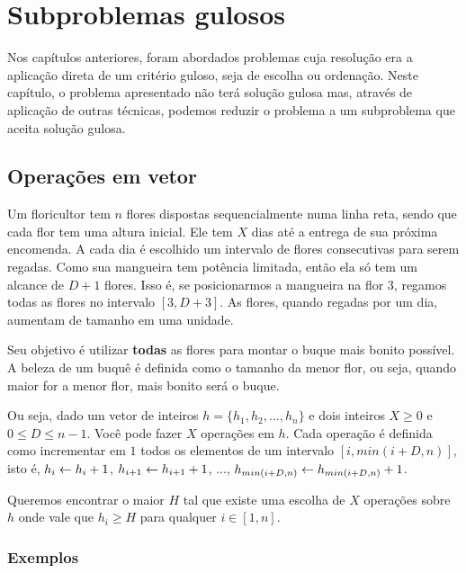\chapter{Subproblemas gulosos}
\label{subproblema}

Nos capítulos anteriores, foram abordados problemas cuja resolução era a aplicação direta de um critério guloso, seja de escolha ou ordenação. Neste capítulo, o problema apresentado não terá solução gulosa mas, através de aplicação de outras técnicas, podemos reduzir o problema a um subproblema que aceita solução gulosa.

\section{Operações em vetor}

Um floricultor tem $n$ flores dispostas sequencialmente numa linha reta, sendo que cada flor tem uma altura inicial. Ele tem $X$ dias até a entrega de sua próxima encomenda. A cada dia é escolhido um intervalo de flores consecutivas para serem regadas. Como sua mangueira tem potência limitada, então ela só tem um alcance de $D + 1$ flores. Isso é, se posicionarmos a mangueira na flor $3$, regamos todas as flores no intervalo $[3, D + 3]$.  As flores, quando regadas por um dia, aumentam de tamanho em uma unidade.

Seu objetivo é utilizar \textbf{todas} as flores para montar o buque mais bonito possível. A beleza de um buquê é definida como o tamanho da menor flor, ou seja, quando maior for a menor flor, mais bonito será o buque.

Ou seja, dado um vetor de inteiros $h = \{h_1, h_2, ..., h_n\}$ e dois inteiros $X \geq 0$ e $0 \leq D \leq n - 1$. Você pode fazer $X$ operações em $h$. Cada operação é definida como incrementar em $1$ todos os elementos de um intervalo $[i, min(i + D, n)]$, isto é, $h_i \leftarrow h_i + 1$, $h_{i + 1} \leftarrow h_{i + 1} + 1$, ..., $h_{min(i + D, n)} \leftarrow h_{min(i + D, n)} + 1$.

Queremos encontrar o maior $H$ tal que existe uma escolha de $X$ operações sobre $h$ onde vale que $h_i \geq H$ para qualquer $i \in [1, n]$.

\subsection*{Exemplos}

